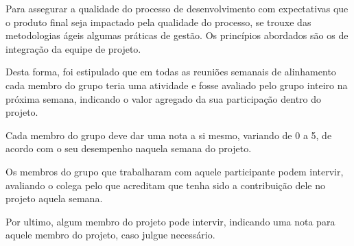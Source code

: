 Para assegurar a qualidade do processo de desenvolvimento com expectativas que o produto final seja impactado pela qualidade do processo, se trouxe das metodologias ágeis algumas práticas de gestão. Os princípios abordados são os de integração da equipe de projeto.

Desta forma, foi estipulado que em todas as reuniões semanais de alinhamento cada membro do grupo teria uma atividade e fosse avaliado pelo grupo inteiro na próxima semana, indicando o valor agregado da sua participação dentro do projeto.

Cada membro do grupo deve dar uma nota a si mesmo, variando de 0 a 5, de acordo com o seu desempenho naquela semana do projeto.

Os membros do grupo que trabalharam com aquele participante podem intervir, avaliando o colega pelo que acreditam que tenha sido a contribuição dele no projeto aquela semana.

Por ultimo, algum membro do projeto pode intervir, indicando uma nota para aquele membro do projeto, caso julgue necessário.


